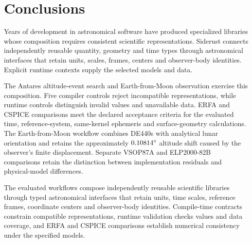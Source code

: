 \section{Conclusions}

Years of development in astronomical software have produced specialized libraries whose composition
requires consistent scientific representations. Siderust connects independently reusable quantity,
geometry and time types through astronomical interfaces that retain units, scales, frames, centers
and observer-body identities. Explicit runtime contexts supply the selected models and data.

The Antares altitude-event search and Earth-from-Moon observation exercise this composition. Five
compiler controls reject incompatible representations, while runtime controls distinguish invalid
values and unavailable data. ERFA and CSPICE comparisons meet the declared acceptance criteria for
the evaluated time, reference-system, same-kernel ephemeris and surface-geometry calculations. The
Earth-from-Moon workflow combines DE440s with analytical lunar orientation and retains the
approximately $0.10814^\circ$ altitude shift caused by the observer's finite displacement.
Separate VSOP87A and ELP2000-82B comparisons retain the distinction between implementation
residuals and physical-model differences.

The evaluated workflows compose independently reusable scientific libraries through typed
astronomical interfaces that retain units, time scales, reference frames, coordinate centers and
observer-body identities. Compile-time contracts constrain compatible representations, runtime
validation checks values and data coverage, and ERFA and CSPICE comparisons establish numerical
consistency under the specified models.
